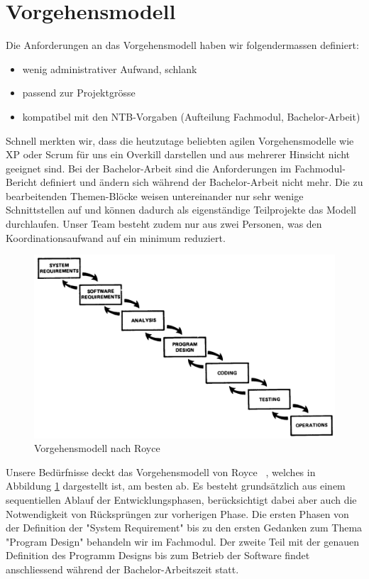 \section{Vorgehensmodell}

Die Anforderungen an das Vorgehensmodell haben wir folgendermassen definiert:

\begin{itemize}  
\item wenig administrativer Aufwand, schlank
\item passend zur Projektgrösse
\item kompatibel mit den NTB-Vorgaben (Aufteilung Fachmodul, Bachelor-Arbeit)
\end{itemize}

Schnell merkten wir, dass die heutzutage beliebten agilen Vorgehensmodelle wie XP oder Scrum für uns ein Overkill darstellen und aus mehrerer Hinsicht nicht geeignet sind. Bei der Bachelor-Arbeit sind die Anforderungen im Fachmodul-Bericht definiert und ändern sich während der Bachelor-Arbeit nicht mehr. Die zu bearbeitenden Themen-Blöcke weisen untereinander nur sehr wenige Schnittstellen auf und können dadurch als eigenständige Teilprojekte das Modell durchlaufen. Unser Team besteht zudem nur aus zwei Personen, was den Koordinationsaufwand auf ein minimum reduziert.

\begin{figure}[htbp]
	\centering
	\includegraphics[width=0.9\linewidth]{img/royce-largePrograms}
	\caption{Vorgehensmodell nach Royce}
	\label{img:royce-largePrograms}
\end{figure}


Unsere Bedürfnisse deckt das Vorgehensmodell von Royce ~\cite{Royce1970}, welches in Abbildung  \ref{img:royce-largePrograms} dargestellt ist, am besten ab. Es besteht grundsätzlich aus einem sequentiellen Ablauf der Entwicklungsphasen, berücksichtigt dabei aber auch die Notwendigkeit von Rücksprüngen zur vorherigen Phase.
Die ersten Phasen von der Definition der "System Requirement" bis zu den ersten Gedanken zum Thema "Program Design" behandeln wir im Fachmodul. Der zweite Teil mit der genauen Definition des Programm Designs bis zum Betrieb der Software findet anschliessend während der Bachelor-Arbeitszeit statt.

